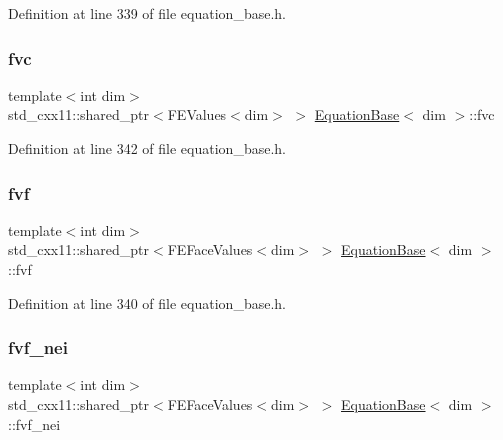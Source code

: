 Definition at line 339 of file equation\+\_\+base.\+h.

\mbox{\label{class_equation_base_a04c2626e352fcc6b1c24c50a7e899c2f}} 
\subsubsection{\texorpdfstring{fvc}{fvc}}
{\footnotesize\ttfamily template$<$int dim$>$ \\
std\+\_\+cxx11\+::shared\+\_\+ptr$<$F\+E\+Values$<$dim$>$ $>$ \hyperlink{class_equation_base}{Equation\+Base}$<$ dim $>$\+::fvc\hspace{0.3cm}{\ttfamily [protected]}}



Definition at line 342 of file equation\+\_\+base.\+h.

\mbox{\label{class_equation_base_a80b624dc27281e2758918d83fd38daf4}} 
\subsubsection{\texorpdfstring{fvf}{fvf}}
{\footnotesize\ttfamily template$<$int dim$>$ \\
std\+\_\+cxx11\+::shared\+\_\+ptr$<$F\+E\+Face\+Values$<$dim$>$ $>$ \hyperlink{class_equation_base}{Equation\+Base}$<$ dim $>$\+::fvf\hspace{0.3cm}{\ttfamily [protected]}}



Definition at line 340 of file equation\+\_\+base.\+h.

\mbox{\label{class_equation_base_abd53ef2bf719d3f8e72881072383180c}} 
\subsubsection{\texorpdfstring{fvf\+\_\+nei}{fvf\_nei}}
{\footnotesize\ttfamily template$<$int dim$>$ \\
std\+\_\+cxx11\+::shared\+\_\+ptr$<$F\+E\+Face\+Values$<$dim$>$ $>$ \hyperlink{class_equation_base}{Equation\+Base}$<$ dim $>$\+::fvf\+\_\+nei\hspace{0.3cm}{\ttfamily [protected]}}



